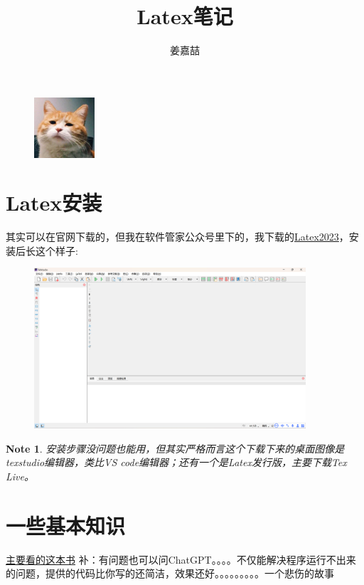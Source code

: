 \documentclass{article}
\title{Latex笔记}
\author{姜嘉喆}
\date{\zhtoday}
\newtheorem{note}{Note}
\begin{document}
	
\maketitle

\graphicspath{{image}}
\begin{figure}[!htb]
\centering
\includegraphics[width=0.2\textwidth]{cat.png}
\end{figure}

\section{Latex安装}
其实可以在官网下载的，但我在软件管家公众号里下的，我下载的\href{https://mp.weixin.qq.com/s/PKXbMBmP8ounwbQE1OiRpw}{Latex2023}，安装后长这个样子:
\begin{figure}[!htb]
\centering
\includegraphics[width=0.9\textwidth]{image/Latex2023.png}
\end{figure}

\begin{note}
    安装步骤没问题也能用，但其实严格而言这个下载下来的桌面图像是texstudio编辑器，类比VS code编辑器；还有一个是Latex发行版，主要下载Tex Live。
\end{note}

\section{一些基本知识}
\href{https://mirrors.tuna.tsinghua.edu.cn/CTAN/info/lshort/chinese/lshort-zh-cn.pdf}{主要看的这本书}
补：有问题也可以问ChatGPT。。。。不仅能解决程序运行不出来的问题，提供的代码比你写的还简洁，效果还好。。。。。。。。。一个悲伤的故事
\end{document}
